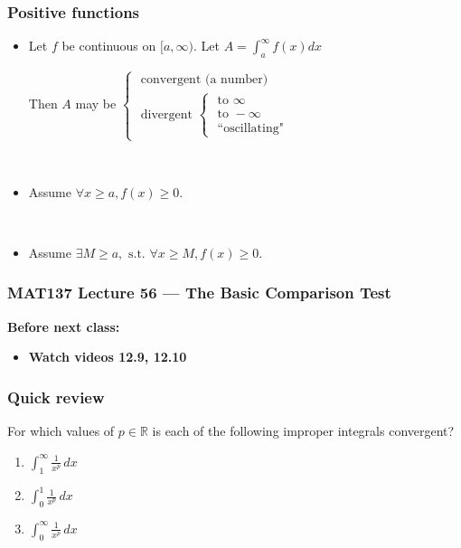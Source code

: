 \documentclass[14pt]{beamer}
\newcommand{\R}{\mathbb{R}}
\newcommand{\p}{\pause}
\newcommand{\setsize}[1]{\fontsize{#1}{#1}\selectfont} %
\newcommand{\smallerfont}{\setsize{13}} %
\begin{document}
	\begin{frame}[t]
		\smallerfont
		\frametitle{Positive functions}

		\begin{itemize}
			\item Let $f$ be continuous on $[a, \infty)$. Let
				${\displaystyle  A = \int_a^{\infty} f(x) dx }$

				Then $A$ may be ${\displaystyle  \begin{cases}\mbox{ convergent (a number) } \\ \mbox{ divergent } \begin{cases}\mbox{ to } \infty \\ \mbox{ to } - \infty \\ \mbox{ ``oscillating"}\end{cases}\end{cases} }$

				\ \p

			\item Assume ${\displaystyle \forall x \geq a, f(x) \geq 0}$.
				\vspace{.2cm}


				\ \p

			\item Assume ${\displaystyle \exists M \geq a, \mbox{ s.t. } \forall x \geq M, f(x) \geq 0}$.
				\vspace{.2cm}

		\end{itemize}
	\end{frame}

\begin{frame}
	\frametitle{MAT137 Lecture 56 --- The Basic Comparison Test}

	\vfill
	{\bf Before next class:}
		\begin{itemize} \normalsize
			\item {\bf Watch videos 12.9, 12.10 }
		\end{itemize}
\end{frame}

	\begin{frame}[t]
		\frametitle{Quick review}

		For which values of ${\displaystyle p \in \R}$ is each of the following
		improper integrals convergent?

		\begin{enumerate}
			\item ${\displaystyle \int_1^{\infty} \frac{1}{x^{p}} \, dx }$

				\vfill

			\item ${\displaystyle \int_0^1 \frac{1}{x^{p}} \, dx }$

				\vfill

			\item ${\displaystyle \int_0^{\infty} \frac{1}{x^{p}} \, dx }$
		\end{enumerate}
	\end{frame}
\end{document}
